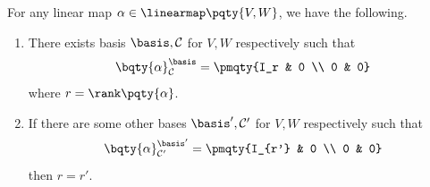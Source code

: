 \begin{theorem}
    \label{thm:rank-and-identity-submatrix}%
    For any linear map \(\alpha \in \linearmap\pqty{V, W}\), we have the following.

    \begin{enumerate}
        \item There exists basis \(\basis, \mathcal{C}\) for \(V, W\) respectively such that
        \[
            \bqty{\alpha}_{\mathcal{C}}^{\basis} = \pmqty{I_r & 0 \\ 0 & 0}
        \]
        where \(r = \rank\pqty{\alpha}\).

        \item If there are some other bases \(\basis', \mathcal{C}'\) for \(V, W\) respectively such that
        \[
            \bqty{\alpha}_{\mathcal{C}'}^{\basis'} = \pmqty{I_{r'} & 0 \\ 0 & 0}
        \]
        then \(r = r'\).
    \end{enumerate}
\end{theorem}

